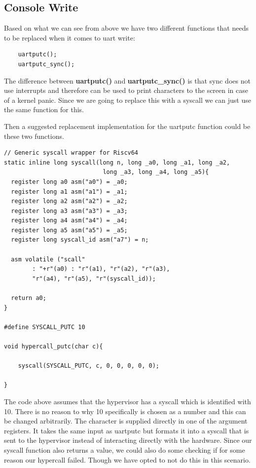 \newpage
\subsection{Console Write}
\label{imp:console-write}

Based on what we can see from above we have two different functions that needs to be replaced when it comes to uart write:
\begin{verbatim}
    uartputc();
    uartputc_sync();
\end{verbatim}

The difference between \textbf{uartputc()} and \textbf{uartputc\_sync()} is that sync does not use interrupts and therefore can be used to print characters to the screen in case of a kernel panic. Since we are going to replace this with a syscall we can just use the same function for this.

Then a suggested replacement implementation for the uartputc function could be these two functions.

\begin{verbatim}
// Generic syscall wrapper for Riscv64
static inline long syscall(long n, long _a0, long _a1, long _a2, 
                            long _a3, long _a4, long _a5){
  register long a0 asm("a0") = _a0;
  register long a1 asm("a1") = _a1;
  register long a2 asm("a2") = _a2;
  register long a3 asm("a3") = _a3;
  register long a4 asm("a4") = _a4;
  register long a5 asm("a5") = _a5;
  register long syscall_id asm("a7") = n;

  asm volatile ("scall"
		: "+r"(a0) : "r"(a1), "r"(a2), "r"(a3), 
        "r"(a4), "r"(a5), "r"(syscall_id));

  return a0;
}

#define SYSCALL_PUTC 10

void hypercall_putc(char c){

    syscall(SYSCALL_PUTC, c, 0, 0, 0, 0, 0);

}
\end{verbatim}

The code above assumes that the hypervisor has a syscall which is identified with 10. There is no reason to why 10 specifically is chosen as a number and this can be changed arbitrarily. The character is supplied directly in one of the argument registers. It takes the same input as uartputc but formats it into a syscall that is sent to the hypervisor instead of interacting directly with the hardware. Since our syscall function also returns a value, we could also do some checking if for some reason our hypercall failed. Though we have opted to not do this in this scenario.  

